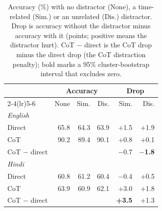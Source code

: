 \begin{table}[t]
\centering
\small
\setlength{\tabcolsep}{4pt}
\begin{tabular}{lrrrrr}
\toprule
 & \multicolumn{3}{c}{Accuracy} & \multicolumn{2}{c}{Drop} \\
\cmidrule(lr){2-4}\cmidrule(lr){5-6}
 & None & Sim. & Dis. & Sim. & Dis. \\
\midrule
\multicolumn{6}{l}{\textit{English}} \\
\quad Direct & 65.8 & 64.3 & 63.9 & +1.5 & +1.9 \\
\quad CoT & 90.2 & 89.4 & 90.1 & +0.8 & +0.1 \\
\quad CoT $-$ direct &  &  &  & $-$0.7 & \textbf{$-$1.8} \\
\midrule
\multicolumn{6}{l}{\textit{Hindi}} \\
\quad Direct & 60.8 & 61.2 & 60.4 & $-$0.4 & +0.5 \\
\quad CoT & 63.9 & 60.9 & 62.1 & +3.0 & +1.8 \\
\quad CoT $-$ direct &  &  &  & \textbf{+3.5} & +1.3 \\
\bottomrule
\end{tabular}
\caption{Accuracy (\%) with no distractor (None), a time-related (Sim.) or an unrelated (Dis.) distractor. Drop is accuracy without the distractor minus accuracy with it (points; positive means the distractor hurt). CoT $-$ direct is the CoT drop minus the direct drop (the CoT distraction penalty); bold marks a 95\% cluster-bootstrap interval that excludes zero.}
\label{tab:distractor}
\end{table}
